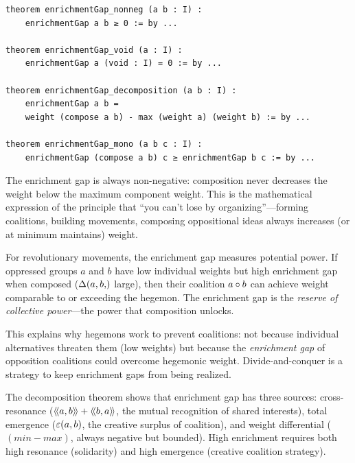 \begin{lstlisting}[caption={Enrichment gap properties (IDT\_v3\_Emergence.lean)}]
theorem enrichmentGap_nonneg (a b : I) :
    enrichmentGap a b ≥ 0 := by ...
    
theorem enrichmentGap_void (a : I) :
    enrichmentGap a (void : I) = 0 := by ...
    
theorem enrichmentGap_decomposition (a b : I) :
    enrichmentGap a b =
    weight (compose a b) - max (weight a) (weight b) := by ...
    
theorem enrichmentGap_mono (a b c : I) :
    enrichmentGap (compose a b) c ≥ enrichmentGap b c := by ...
\end{lstlisting}

\begin{interpretation}
The enrichment gap is always non-negative: composition never decreases the
weight below the maximum component weight. This is the mathematical expression
of the principle that ``you can't lose by organizing''---forming coalitions,
building movements, composing oppositional ideas always increases (or at minimum
maintains) weight.

For revolutionary movements, the enrichment gap measures potential power. If
oppressed groups $a$ and $b$ have low individual weights but high enrichment
gap when composed ($\enrich{a,b}$ large), then their coalition $a \circ b$
can achieve weight comparable to or exceeding the hegemon. The enrichment gap
is the \emph{reserve of collective power}---the power that composition unlocks.

This explains why hegemons work to prevent coalitions: not because individual
alternatives threaten them (low weights) but because the \emph{enrichment gap}
of opposition coalitions could overcome hegemonic weight. Divide-and-conquer
is a strategy to keep enrichment gaps from being realized.

The decomposition theorem shows that enrichment gap has three sources:
cross-resonance ($\langle\!\langle a, b \rangle\!\rangle + \langle\!\langle b, a \rangle\!\rangle$, the mutual recognition of shared
interests), total emergence ($\varepsilon(a,b)$, the creative surplus of coalition),
and weight differential ($(min - max)$, always negative but bounded). High
enrichment requires both high resonance (solidarity) and high emergence
(creative coalition strategy).
\end{interpretation}

